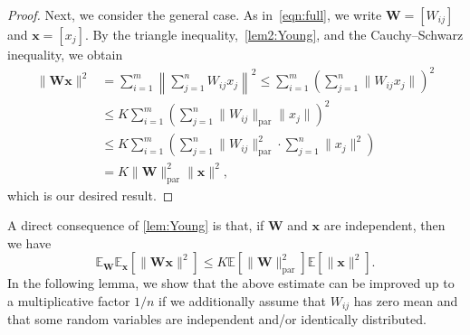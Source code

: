 \documentclass[10pt,a4paper]{amsart}
\numberwithin{equation}{section}
\theoremstyle{remark}
\newcommand\bW{\mathbf{W}}
\newcommand\bx{\mathbf{x}}
\newcommand\bbE{\mathbb{E}}
\newcommand\param{\mathrm{par}}
\begin{document}
\begin{proof}
    Next, we consider the general case.
    As in~\eqref{eqn:full}, we write $\bW = [W_{ij}]$ and $\bx = [x_{j}]$.
    By the triangle inequality,~\eqref{lem2:Young}, and the Cauchy--Schwarz inequality, we obtain
    \begin{align*}
        \| \bW \bx \|^2 &= \sum_{i=1}^m \left\| \sum_{j=1}^n W_{ij} x_{j} \right\|^2
        \leq \sum_{i=1}^m \left( \sum_{j=1}^n \| W_{ij} x_{j} \| \right)^2 \\
        &\leq K \sum_{i=1}^m \left( \sum_{j=1}^n \| W_{ij} \|_{\param} \|x_{j} \| \right)^2 \\
        &\leq K \sum_{i=1}^m \left( \sum_{j=1}^n \| W_{ij} \|_{\param}^2 \cdot \sum_{j=1}^n \| x_{j} \|^2 \right) \\
        &=  K \| \bW \|_{\param}^2 \| \bx \|^2,
    \end{align*}
    which is our desired result.
\end{proof}

A direct consequence of \cref{lem:Young} is that, if $\bW$ and $\bx$ are independent, then we have
\begin{equation}
\label{eqn:Young}
    \bbE_{\bW} \bbE_{\bx} \left[ \| \bW \bx \|^2 \right] \leq K \bbE \left[ \| \bW \|_{\param}^2 \right] \bbE \left[ \| \bx \|^2 \right].
\end{equation}
In the following lemma, we show that the above estimate can be improved up to a multiplicative factor $1/n$ if we additionally assume that $W_{ij}$ has zero mean and that some random variables are independent and/or identically distributed.
\end{document}
